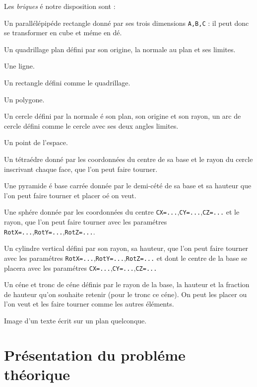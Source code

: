\documentclass[fontsize=11pt,english,BCOR=10mm,DIV=12,bibliography=totoc,parskip=false,headings=small,
    headinclude=false,footinclude=false,oneside]{pst-doc}
\begin{document}
Les \textit{briques} é notre disposition sont :
\begin{compactitem}
  \item Un parallélépipéde rectangle donné par ses trois
  dimensions \verb+A,B,C+ : il peut donc se transformer en cube et
  méme en dé.
  \item Un quadrillage plan défini par son origine, la normale au
  plan et ses limites.
  \item Une ligne.
  \item Un rectangle défini comme le quadrillage.
  \item Un polygone.
  \item Un cercle défini par la normale é son plan, son origine et
  son rayon, un arc de cercle défini comme le cercle avec ses deux angles limites.
  \item Un point de l'espace.
  \item Un tétraédre donné par les coordonnées du centre de sa base et le rayon du
  cercle inscrivant chaque face, que l'on peut faire
  tourner.
  \item Une pyramide é base carrée donnée par le demi-cété de sa
  base et sa hauteur que l'on peut faire tourner et placer oé on
  veut.
  \item Une sphére donnée par les coordonnées du centre \verb+CX=...+,\verb+CY=...+,\verb+CZ=...+
   et le rayon, que l'on peut faire
  tourner avec les paramétres
  \verb+RotX=...+,\verb+RotY=...+,\verb+RotZ=...+.
  \item Un cylindre vertical défini par son rayon, sa hauteur, que l'on peut faire
  tourner avec les paramétres
  \verb+RotX=...+,\verb+RotY=...+,\verb+RotZ=...+ et dont le centre
  de la base se placera avec les paramétres \verb+CX=...+,\verb+CY=...+,\verb+CZ=...+
  \item Un céne et tronc de céne définis par le rayon de la base,
  la hauteur et la fraction de hauteur qu'on souhaite retenir (pour le tronc ce céne).
  On peut les placer ou l'on veut et les faire tourner comme les autres éléments.
  \item Image d'un texte écrit sur un plan quelconque.
\end{compactitem}

\clearpage
\section{Présentation du probléme théorique}
\end{document}
